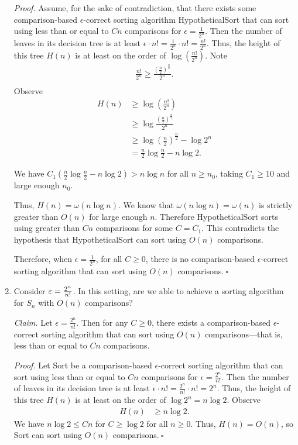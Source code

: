 \begin{enumerate}[resume]
\begin{solution}
\textit{Proof. }Assume, for the sake of contradiction, that there exists some comparison-based $\epsilon$-correct sorting algorithm {\sc HypotheticalSort} that can sort using less than or equal to $Cn$ comparisons for $\epsilon=\frac{1}{2^n}$. Then the number of leaves in its decision tree is at least $\epsilon\cdot n!=\frac{1}{2^n}\cdot n!=\frac{n!}{2^n}$. Thus, the height of this tree $H(n)$ is at least on the order of $\log\left(\frac{n!}{2^n}\right)$. Note
\begin{align*}
\frac{n!}{2^n}\geq\frac{\left(\frac{n}{2}\right)^{\frac{n}{2}}}{2^n}.\\
\end{align*}
Observe
\begin{align*}
H(n)&\geq\log\left(\frac{n!}{2^n}\right)\\
&\geq\log\frac{\left(\frac{n}{2}\right)^{\frac{n}{2}}}{2^n}\\
&\geq\log\left(\frac{n}{2}\right)^{\frac{n}{2}}-\log2^n\\
&=\frac{n}{2}\log\frac{n}{2}-n\log 2.
\end{align*}

We have $C_1\left(\frac{n}{2}\log\frac{n}{2}-n\log 2\right)>n\log n$ for all $n\geq n_0$, taking $C_1\geq 10$ and large enough $n_0$.

Thus, $H(n)=\omega(n\log n)$. We know that $\omega(n\log n)=\omega(n)$ is strictly greater than $O(n)$ for large enough $n$. Therefore {\sc HypotheticalSort} sorts using greater than $Cn$ comparisons for some $C=C_1$. This contradicts the hypothesis that {\sc HypotheticalSort} can sort using $O(n)$ comparisons.

Therefore, when $\epsilon=\frac{1}{2^n}$, for all $C\geq 0$, there is no comparison-based $\epsilon$-correct sorting algorithm that can sort using $O(n)$ comparisons.$~\square$
\end{solution}
\newpage 
    \item Consider $\varepsilon=\frac{2^n}{n!}$. In this setting, are we able to achieve a sorting algorithm for $S_n$ with $O(n)$ comparisons?
\begin{solution}
\textit{Claim. }Let $\epsilon=\frac{2^n}{n!}$. Then for any $C\geq 0$, there exists a comparison-based $\epsilon$-correct sorting algorithm that can sort using $O(n)$ comparisons---that is, less than or equal to $Cn$ comparisons.

\textit{Proof. }Let {\sc Sort} be a comparison-based $\epsilon$-correct sorting algorithm that can sort using less than or equal to $Cn$ comparisons for $\epsilon=\frac{2^n}{n!}$. Then the number of leaves in its decision tree is at least $\epsilon\cdot n!=\frac{2^n}{n!}\cdot n!=2^n$. Thus, the height of this tree $H(n)$ is at least on the order of $\log 2^n=n\log 2$. Observe
\begin{align*}
H(n)&\geq n\log 2.
\end{align*}
We have $n\log{2}\leq Cn$ for $C\geq\log{2}$ for all $n\geq 0$. Thus, $H(n)=O(n)$, so {\sc Sort} can sort using $O(n)$ comparisons.$~\square$
\end{solution}
\end{enumerate}
\newpage
